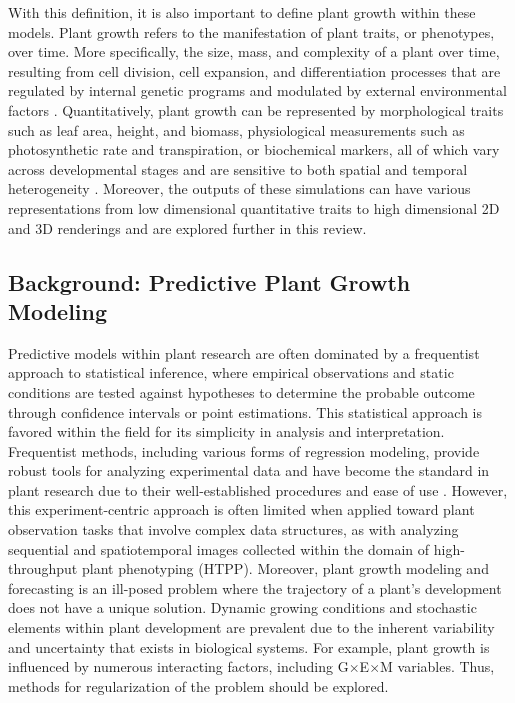 \documentclass{article}
\begin{document}
With this definition, it is also important to define plant growth within these models. 
Plant growth refers to the manifestation of plant traits, or phenotypes, over time. More specifically, the size, mass, and complexity of a plant over time, resulting from cell division, cell expansion, and differentiation processes that are regulated by internal genetic programs and modulated by external environmental factors \cite{Brukhin_Morozova_2011,alberts2002plant}. 
Quantitatively, plant growth can be represented by morphological traits such as  leaf area, height, and biomass, physiological measurements such as photosynthetic rate and transpiration, or biochemical markers, all of which vary across developmental stages and are sensitive to both spatial and temporal heterogeneity \cite{annurev-arplant-050312-120137}.
Moreover, the outputs of these simulations can have various representations from low dimensional quantitative traits to high dimensional 2D and 3D renderings and are explored further in this review.

\subsection{Background: Predictive Plant Growth Modeling}
Predictive models within plant research are often dominated by a frequentist approach to statistical inference, where empirical observations and static conditions are tested against hypotheses to determine the probable outcome through confidence intervals or point estimations. 
This statistical approach is favored within the field for its simplicity in analysis and interpretation. 
Frequentist methods, including various forms of regression modeling, provide robust tools for analyzing experimental data and have become the standard in plant research due to their well-established procedures and ease of use \cite{hoshmand2018design,bender2020statistical}. 
However, this experiment-centric approach is often limited when applied toward plant observation tasks that involve complex data structures, as with analyzing sequential and spatiotemporal images collected within the domain of high-throughput plant phenotyping (HTPP). 
Moreover, plant growth modeling and forecasting is an ill-posed problem where the trajectory of a plant's development does not have a unique solution. 
Dynamic growing conditions and stochastic elements within plant development are prevalent due to the inherent variability and uncertainty that exists in biological systems. 
For example, plant growth is influenced by numerous interacting factors, including G$\times$E$\times$M variables. Thus, methods for regularization of the problem should be explored.
\end{document}
